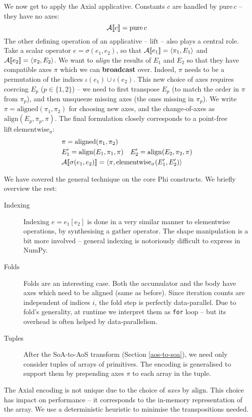 We now get to apply the Axial applicative. Constants $c$ are handled by $\mathrm{pure}\,c$ -- they have no axes:
$$ \mathcal A \denot{c} = \mathrm{pure}\,c $$
The other defining operation of an applicative -- $\mathrm{lift}$ -- also plays a central role. 
Take a scalar operator $e = \sigma(e_1, e_2)$, so that $\mathcal A \denot{e_1} = \phipair{\pi_{1}}{E_1}$ and $\mathcal A \denot{e_2} = \phipair{\pi_{2}}{E_2}$. 
We want to \textit{align} the results of $E_1$ and $E_2$ so that they have compatible axes $\pi$ which we can \textbf{broadcast} over. 
Indeed, $\pi$ needs to be a permutation of the indices $\iota(e_1) \cup \iota(e_2)$. 
This new choice of axes requires coercing $E_p$ ($p \in \{1, 2\}$) -- we need to first transpose $E_p$ (to match the order in $\pi$ from $\pi_{p}$), and then unsqueeze missing axes (the ones missing in $\pi_{p}$). 
We write $\pi = \mathrm{aligned}(\pi_{1}, \pi_{2})$ for choosing new axes, and the change-of-axes as $\mathrm{align}(E_p, \pi_{p}, \pi)$. The final formulation closely corresponds to a point-free $\mathrm{lift}\,\mathrm{elementwise}_\sigma$:
\begin{align*}
\begin{split}
&\pi = \mathrm{aligned}(\pi_{1}, \pi_{2}) \\
&E_1' = \mathrm{align}(E_1, \pi_{1}, \pi) \quad E_2' = \mathrm{align}(E_2, \pi_{2}, \pi) \\
&\mathcal A \denot{\sigma(e_1, e_2)} = \left\langle \pi, \mathrm{elementwise}_{\sigma}(E_1', E_2') \right\rangle 
\end{split}
\end{align*}

We have covered the general technique on the core Phi constructs. We briefly overview the rest:
\begin{description}
    \item[Indexing] Indexing $e = e_1[e_2]$ is done in a very similar manner to elementwise operations, by synthesising a $\mathrm{gather}$ operator. The shape manipulation is a bit more involved -- general indexing is notoriously difficult to express in NumPy.
    \item[Folds] Folds are an interesting case. Both the accumulator and the body have axes which need to be aligned (same as before). Since iteration counts are independent of indices $i$, the fold step is perfectly data-parallel. Due to fold's generality, at runtime we interpret them as \texttt{for} loop -- but its overhead is often helped by data-parallelism.
    \item[Tuples] After the SoA-to-AoS transform (Section \ref{aos-to-soa}), we need only consider tuples of arrays of primitives. The encoding is generalised to support them by prepending axes $\pi$ to each array in the tuple.  
\end{description}
The Axial encoding is not unique due to the choice of \textit{axes} by $\mathrm{align}$. This choice has impact on performance -- it corresponds to the in-memory representation of the array. We use a deterministic heuristic to minimise the transpositions needed. 

